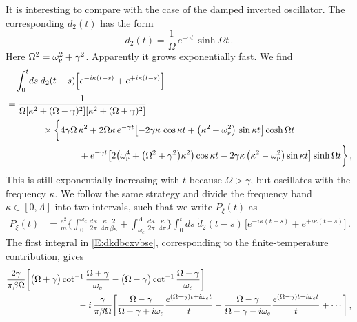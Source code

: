 \documentclass[11pt,a4paper]{article}
\begin{document}
It is interesting to compare with the case of the damped inverted oscillator. The corresponding $d_{2}(t)$ has the form
\begin{equation}
	d_{2}(t)=\frac{1}{\Omega}\,e^{-\gamma t}\,\sinh\Omega t\,.
\end{equation}
Here $\Omega^{2}=\omega_{\textsc{p}}^{2}+\gamma^{2}$. Apparently it grows exponentially fast. We find
\begin{align}
	&\quad\int_{0}^{t}\!ds\;d_{2}(t-s)\Bigl[e^{-i\kappa(t-s)}+e^{+i\kappa(t-s)}\Bigr]\notag\\
	&=\frac{1}{\Omega[\kappa^{2}+(\Omega-\gamma)^{2}][\kappa^{2}+(\Omega+\gamma)^{2}]}\\
	&\qquad\qquad\times\biggl\{4\gamma\Omega\,\kappa^{2}+2\Omega\kappa\,e^{-\gamma t}\bigl[-2\gamma\kappa\,\cos\kappa t+\bigl(\kappa^{2}+\omega_{\textsc{p}}^{2}\bigr)\,\sin\kappa t\bigr]\cosh\Omega t\biggr.\notag\\
	&\qquad\qquad\qquad\qquad+\biggl.e^{-\gamma t}\bigl[2\bigl(\omega_{\textsc{p}}^{4}+\bigl(\Omega^{2}+\gamma^{2}\bigr)\kappa^{2}\bigr)\cos\kappa t-2\gamma\kappa\,\bigl(\kappa^{2}-\omega_{\textsc{p}}^{2}\bigr)\sin\kappa t\bigr]\sinh\Omega t\biggr\}\,,\notag
\end{align}
This is still exponentially increasing with $t$ because $\Omega>\gamma$, but oscillates with the frequency $\kappa$. We follow the same strategy and divide the frequency band $\kappa\in[0,\Lambda]$ into two intervals, such that we write $P_{\xi}(t)$ as
\begin{align}\label{E:dkdbcxvbse}
	P_{\xi}(t)&=\frac{e^{2}}{m}\biggl\{\int_{0}^{\omega_{c}}\!\frac{d\kappa}{2\pi}\;\frac{\kappa}{4\pi}\frac{2}{\beta\kappa}+\int_{\omega_{c}}^{\Lambda}\!\frac{d\kappa}{2\pi}\;\frac{\kappa}{4\pi}\biggr\}\int_{0}^{t}\!ds\;\dot{d}_{2}(t-s)\,\bigl[e^{-i\kappa(t-s)}+e^{+i\kappa(t-s)}\bigr]\,.
\end{align}
The first integral in \eqref{E:dkdbcxvbse}, corresponding to the finite-temperature contribution, gives
\begin{align}
	&\frac{2\gamma}{\pi\beta\Omega}\biggl[\bigl(\Omega+\gamma\bigr)\cot^{-1}\frac{\Omega+\gamma}{\omega_{c}}-\bigl(\Omega-\gamma\bigr)\cot^{-1}\frac{\Omega-\gamma}{\omega_{c}}\biggr]\\
	&\qquad\qquad\qquad\qquad-i\,\frac{\gamma}{\pi\beta\Omega}\biggl[\frac{\Omega-\gamma}{\Omega-\gamma+i\omega_{c}}\frac{e^{(\Omega-\gamma)t+i\omega_{c}t}}{t}-\frac{\Omega-\gamma}{\Omega-\gamma-i\omega_{c}}\frac{e^{(\Omega-\gamma)t-i\omega_{c}t}}{t}+\cdots\biggr]\,,\notag
\end{align}
\end{document}
